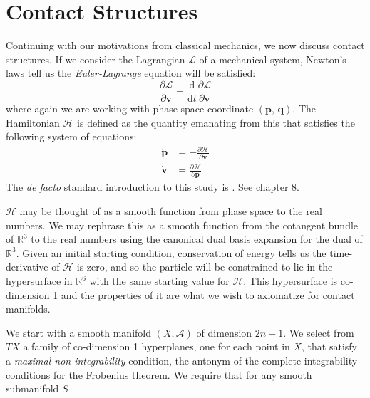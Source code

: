 \section{Contact Structures}
    Continuing with our motivations from classical mechanics, we now discuss
    contact structures. If we consider the Lagrangian $\mathcal{L}$ of a
    mechanical system, Newton's laws tell us the \textit{Euler-Lagrange}
    equation will be satisfied:
    \begin{equation}
        \frac{\partial\mathcal{L}}{\partial\mathbf{v}}
        =\frac{\textrm{d}}{\textrm{d}t}
        \frac{\partial\mathcal{L}}{\partial\dot{\mathbf{v}}}
    \end{equation}
    where again we are working with phase space coordinate
    $(\mathbf{p},\,\mathbf{q})$. The Hamiltonian $\mathcal{H}$ is defined as
    the quantity emanating from this that satisfies the following system of
    equations:
    \begin{align}
        \dot{\mathbf{p}}&=-\frac{\partial\mathcal{H}}{\partial\mathbf{v}}\\
        \dot{\mathbf{v}}&=\frac{\partial\mathcal{H}}{\partial\mathbf{p}}
    \end{align}
    The \textit{de facto} standard introduction to this study is
    \cite{GoldsteinClassicalMechanics}. See chapter 8.
    \par\hfill\par
    $\mathcal{H}$ may be thought of as a smooth function from phase space to
    the real numbers. We may rephrase this as a smooth function from the
    cotangent bundle of $\mathbb{R}^{3}$ to the real numbers using the
    canonical dual basis expansion for the dual of $\mathbb{R}^{3}$. Given an
    initial starting condition, conservation of energy tells us the
    time-derivative of $\mathcal{H}$ is zero, and so the particle will be
    constrained to lie in the hypersurface in $\mathbb{R}^{6}$ with the same
    starting value for $\mathcal{H}$. This hypersurface is co-dimension 1 and
    the properties of it are what we wish to axiomatize for contact manifolds.
    \par\hfill\par
    We start with a smooth manifold $(X,\mathcal{A})$ of dimension $2n+1$.
    We select from $TX$ a family of co-dimension 1 hyperplanes,
    one for each point in $X$,
    that satisfy a \textit{maximal non-integrability} condition,
    the antonym of the complete integrability conditions for the Frobenius
    theorem. We require that for any smooth submanifold $S$
